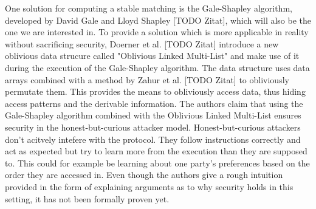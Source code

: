 One solution for computing a stable matching is the Gale-Shapley algorithm, developed by David Gale and Lloyd Shapley [TODO Zitat], which will also be the one we are interested in. To provide a solution which is more applicable in reality without sacrificing security, Doerner et al. [TODO Zitat] introduce a new oblivious data strucure called "Oblivious Linked Multi-List" and make use of it during the execution of the Gale-Shapley algorithm. The data structure uses data arrays combined with a method by Zahur et al. [TODO Zitat] to obliviously permutate them. This provides the means to obliviously access data, thus hiding access patterns and the derivable information. The authors claim that using the Gale-Shapley algorithm combined with the Oblivious Linked Multi-List ensures security in the honest-but-curious attacker model. Honest-but-curious attackers don't acitvely intefere with the protocol. They follow instructions correctly and act as expected but try to learn more from the execution than they are supposed to. This could for example be learning about one party's preferences based on the order they are accessed in. Even though the authors give a rough intuition provided in the form of explaining arguments as to why security holds in this setting, it has not been formally proven yet.